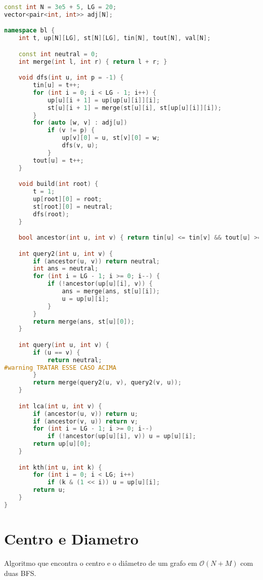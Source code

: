 \documentclass[10pt, a4paper, oneside]{book}
\begin{document}
\begin{lstlisting}[language=C++]
const int N = 3e5 + 5, LG = 20;
vector<pair<int, int>> adj[N];

namespace bl {
    int t, up[N][LG], st[N][LG], tin[N], tout[N], val[N];

    const int neutral = 0;
    int merge(int l, int r) { return l + r; }

    void dfs(int u, int p = -1) {
        tin[u] = t++;
        for (int i = 0; i < LG - 1; i++) {
            up[u][i + 1] = up[up[u][i]][i];
            st[u][i + 1] = merge(st[u][i], st[up[u][i]][i]);
        }
        for (auto [w, v] : adj[u])
            if (v != p) {
                up[v][0] = u, st[v][0] = w;
                dfs(v, u);
            }
        tout[u] = t++;
    }

    void build(int root) {
        t = 1;
        up[root][0] = root;
        st[root][0] = neutral;
        dfs(root);
    }

    bool ancestor(int u, int v) { return tin[u] <= tin[v] && tout[u] >= tout[v]; }

    int query2(int u, int v) {
        if (ancestor(u, v)) return neutral;
        int ans = neutral;
        for (int i = LG - 1; i >= 0; i--) {
            if (!ancestor(up[u][i], v)) {
                ans = merge(ans, st[u][i]);
                u = up[u][i];
            }
        }
        return merge(ans, st[u][0]);
    }

    int query(int u, int v) {
        if (u == v) {
            return neutral;
#warning TRATAR ESSE CASO ACIMA
        }
        return merge(query2(u, v), query2(v, u));
    }

    int lca(int u, int v) {
        if (ancestor(u, v)) return u;
        if (ancestor(v, u)) return v;
        for (int i = LG - 1; i >= 0; i--)
            if (!ancestor(up[u][i], v)) u = up[u][i];
        return up[u][0];
    }

    int kth(int u, int k) {
        for (int i = 0; i < LG; i++)
            if (k & (1 << i)) u = up[u][i];
        return u;
    }
}
\end{lstlisting}
\hfill

\section{Centro e Diametro}


Algoritmo que encontra o centro e o diâmetro de um grafo em $\mathcal{O}(N + M)$ com duas BFS.
\end{document}
